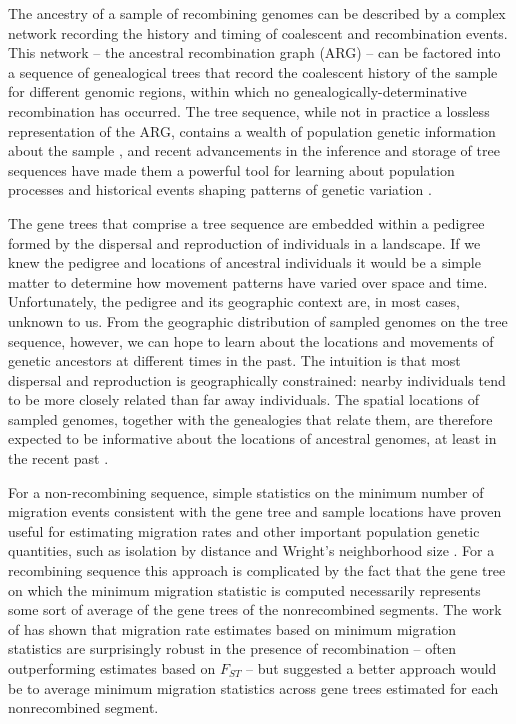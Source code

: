 The ancestry of a sample of recombining genomes can be described by a complex
network recording the history and timing of coalescent and recombination
events. This network -- the ancestral recombination graph (ARG) -- can be
factored into a sequence of genealogical trees that record the coalescent 
history of the sample for different genomic regions, within which no 
genealogically-determinative recombination has occurred. The tree sequence, 
while not in practice a lossless representation of the ARG, contains a wealth 
of population genetic information about the sample \cite{Ralph_etal_2020}, and
recent advancements in the inference and storage of tree sequences have made 
them a powerful tool for learning about population processes and historical 
events shaping patterns of genetic variation
\cite{Anderson-Trocme_etal_2023, Kelleher_etal_2016, Kelleher_etal_2019}.

The gene trees that comprise a tree sequence are embedded within a pedigree
formed by the dispersal and reproduction of individuals in a landscape. If we 
knew the pedigree and locations of ancestral individuals it would be a simple 
matter to determine how movement patterns have varied over space and time. 
Unfortunately, the pedigree and its geographic context are, in most cases, 
unknown to us. From the geographic distribution of sampled genomes on the tree
sequence, however, we can hope to learn about the locations and movements of 
genetic ancestors at different times in the past. The intuition is that most
dispersal and reproduction is geographically constrained: nearby individuals 
tend to be more closely related than far away individuals.  The spatial 
locations of sampled genomes, together with the genealogies that relate them, 
are therefore expected to be informative about the locations of ancestral 
genomes, at least in the recent past \cite{Wakeley_1999, Wilkins_2004}.

For a non-recombining sequence, simple statistics on the minimum number of
migration events consistent with the gene tree and sample locations have
proven useful for estimating migration rates and other important population
genetic quantities, such as isolation by distance and Wright's neighborhood
size \cite{Slatkin_Maddison_1989, Slatkin_Maddison_1990}. For a recombining
sequence this approach is complicated by the fact that the gene tree on which
the minimum migration statistic is computed necessarily represents some sort of
average of the gene trees of the nonrecombined segments. The work of 
\cite{Hudson_etal_1992} has shown that migration rate estimates based on
minimum migration statistics are surprisingly robust in the presence of
recombination -- often outperforming estimates based on $F_{ST}$ -- but 
suggested a better approach would be to average minimum migration 
statistics across gene trees estimated for each nonrecombined segment.


